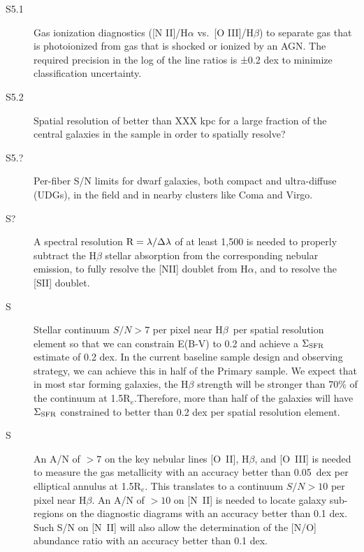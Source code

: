 \documentclass[preprint,11pt]{aastex}
\newcommand{\Hbeta}{{H$\beta$}}
\newcommand{\Reff}{{R$_{e}$}}
\begin{document}
\begin{description}

\item[S5.1] Gas ionization diagnostics ([N II]/H$\alpha$ vs.\ 
[O III]/H$\beta$) to separate gas that is photoionized from gas 
that is shocked or ionized by an AGN. The required precision in 
the log of the line ratios is ±0.2 dex to minimize classification 
uncertainty.

\item[S5.2] Spatial resolution of better than XXX kpc for a large
  fraction of the central galaxies in the sample in order to spatially
  resolve?

\item[S5.?] Per-fiber S/N limits for dwarf galaxies, both compact and
ultra-diffuse (UDGs), in the field and in nearby clusters like Coma
and Virgo.

\item [S?] A spectral resolution $\rm R=\lambda/\Delta \lambda$ of
  at least 1,500 is needed to properly subtract the H$\beta$ stellar
  absorption from the corresponding nebular emission, to fully resolve
  the [NII] doublet from H$\alpha$, and to resolve the [SII] doublet.

\item [S] Stellar continuum $S/N > 7$ per pixel near \Hbeta\ per
  spatial resolution element so that we can constrain E(B-V) to 0.2
  and achieve a ${\rm \Sigma_{SFR}}$ estimate of 0.2 dex. In the
  current baseline sample design and observing strategy, we can
  achieve this in half of the Primary sample. We expect that in most
  star forming galaxies, the H$\beta$ strength will be stronger than
  70\% of the continuum at 1.5\Reff.Therefore, more than half of the
  galaxies will have ${\rm \Sigma_{SFR}}$ constrained to better than
  0.2 dex per spatial resolution element.

\item [S] An A/N of $>7$ on the key nebular lines [O~II], H$\beta$, and
  [O~III] is needed to measure the gas metallicity with an accuracy
  better than 0.05~dex per elliptical annulus at 1.5\Reff. This translates
  to a continuum $S/N > 10$ per pixel near \Hbeta.
  An A/N of $>10$ on [N~II] is needed to locate galaxy sub-regions on the
  diagnostic diagrams with an accuracy better than 0.1 dex. Such S/N
  on [N~II] will also allow the determination of the [N/O] abundance
  ratio with an accuracy better than 0.1 dex.  %


\end{description}
\end{document}
